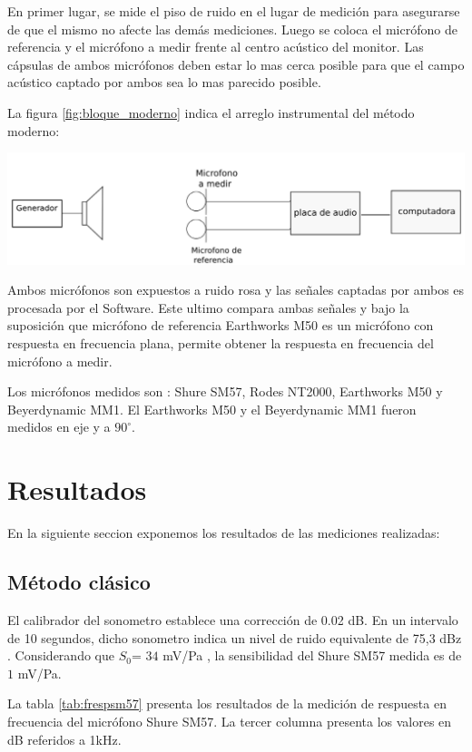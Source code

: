 \documentclass[]{article}
\makeatletter
\newenvironment{figurehere}   %
  {\def\@captype{figure}}   %
  {\par\medskip}
  {}              %
\makeatother
\begin{document}
\begin{multicols}{2}
En primer lugar, se mide el piso de ruido en el lugar de medición para asegurarse
de que el mismo no afecte las demás mediciones. Luego se coloca el micrófono de
referencia y el micrófono a medir frente al centro acústico del monitor.
Las cápsulas de ambos micrófonos deben estar lo mas cerca posible para que el
campo acústico captado por ambos sea lo mas parecido posible.

La figura \ref{fig:bloque_moderno} indica el arreglo instrumental del método
moderno:

\begin{figurehere}
 \centering
 \includegraphics[width=\linewidth]{blockdiag2}
 \label{fig:bloque_moderno}
\end{figurehere}

Ambos micrófonos son expuestos a ruido rosa y las señales captadas por ambos
es procesada por el Software. Este ultimo compara ambas señales y bajo la
suposición que micrófono de referencia Earthworks M50 es un micrófono con
respuesta en frecuencia plana, permite obtener la respuesta en frecuencia del
micrófono a medir.

Los micrófonos medidos son : Shure SM57, Rodes NT2000, Earthworks M50 y
Beyerdynamic MM1. El Earthworks M50 y el Beyerdynamic MM1 fueron medidos en eje
y a $90^\circ$.

\section{Resultados}
En la siguiente seccion exponemos los resultados de las mediciones realizadas:
\subsection{Método clásico}

El calibrador del sonometro establece una corrección de 0.02 dB. En un intervalo
de 10 segundos, dicho sonometro indica un nivel de ruido equivalente de 75,3 dBz
. Considerando que $S_0$= $34$ mV/Pa , la sensibilidad del Shure SM57 medida es de
$1$ mV/Pa.

La tabla \ref{tab:frespsm57} presenta los resultados de la medición de respuesta en
frecuencia del micrófono Shure SM57. La tercer columna presenta los valores en dB
referidos a 1kHz.


\end{multicols}
\end{document}
